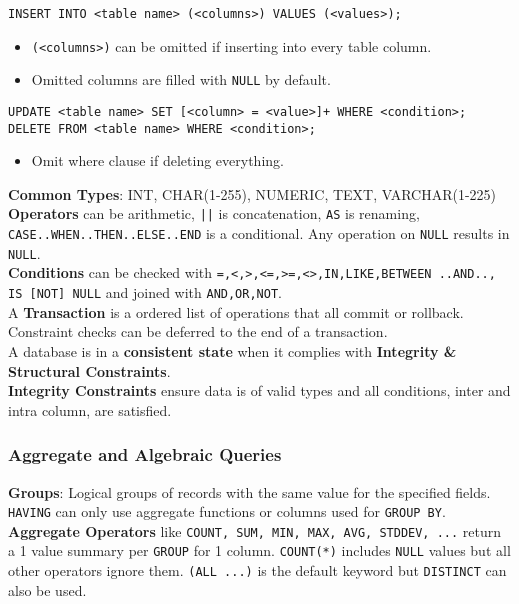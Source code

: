 \begin{multicols*}{3}
\noindent\texttt{INSERT INTO <table name> (<columns>) VALUES (<values>);} 
\begin{itemize}[leftmargin=*]
    \item \texttt{(<columns>)} can be omitted if inserting into every table column.
    \item Omitted columns are filled with \texttt{NULL} by default.\\
\end{itemize}

\noindent\texttt{UPDATE <table name> SET [<column> = <value>]+ WHERE <condition>;}\\

\noindent\texttt{DELETE FROM <table name> WHERE <condition>;}
\begin{itemize}[leftmargin=*]
    \item Omit where clause if deleting everything. \\
\end{itemize}

\noindent\textbf{Common Types}: INT, CHAR(1-255), NUMERIC, TEXT, VARCHAR(1-225)\\
\textbf{Operators} can be arithmetic, \texttt{||} is concatenation, \texttt{AS} is renaming, \texttt{CASE..WHEN..THEN..ELSE..END} is a conditional. Any operation on \texttt{NULL} results in \texttt{NULL}. \\
\textbf{Conditions} can be checked with \texttt{=,<,>,<=,>=,<>,IN,LIKE,BETWEEN ..AND.., IS [NOT] NULL} and joined with \texttt{AND,OR,NOT}. \\

\noindent A \textbf{Transaction} is a ordered list of operations that all commit or rollback. Constraint checks can be deferred to the end of a transaction.\\

\noindent A database is in a \textbf{consistent state} when it complies with \textbf{Integrity \& Structural Constraints}.\\
\textbf{Integrity Constraints} ensure data is of valid types and all conditions, inter and intra column, are satisfied. \\

\subsubsection{Aggregate and Algebraic Queries}
\textbf{Groups}: Logical groups of records with the same value for the specified fields. \texttt{HAVING} can only use aggregate functions or columns used for \texttt{GROUP BY}. \\
\textbf{Aggregate Operators} like \texttt{COUNT, SUM, MIN, MAX, AVG, STDDEV, ...} return a 1 value summary per \texttt{GROUP} for 1 column. \texttt{COUNT(*)} includes \texttt{NULL} values but all other operators ignore them. \texttt{(ALL ...)} is the default keyword but \texttt{DISTINCT} can also be used.\\


\end{multicols*}
